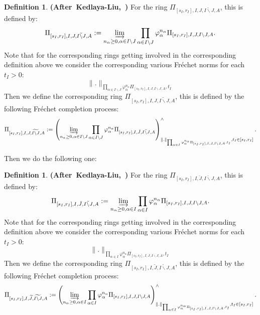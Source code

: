 \documentclass[12pt]{amsart}
\theoremstyle{definition}
\newtheorem{definition}[theorem]{Definition}
\numberwithin{equation}{section}
\begin{document}
\begin{definition}\mbox{\bf{(After Kedlaya-Liu, \cite[Definition 5.2.1]{KL2})}}
For the ring $\Pi_{[s_I,r_I],I,{J},\breve{I\backslash J},A}$, this is defined by:
\begin{align}
\Pi_{[s_I,r_I],I,{J},\breve{I\backslash J},A}:=\varinjlim_{n_\alpha\geq 0,\alpha  \in I\backslash J}\prod_{\alpha\in I\backslash J}\varphi_\alpha^{n_\alpha}\Pi_{[s_I,r_I],I,{J},I\backslash J,A}.
\end{align}
Note that for the corresponding rings getting involved in the corresponding definition above we consider the corresponding various Fr\'echet norms for each $t_I>0$:
\begin{displaymath}
\|.\|_{\prod_{\alpha\in I\backslash J}\varphi_\alpha^{n_\alpha}\Pi_{[s_I,r_I],I,{J},I\backslash J,A},t_I}	
\end{displaymath}
Then we define the corresponding ring $\Pi_{[s_I,r_I],I,{J},\widetilde{I\backslash J},A}$, this is defined by the following Fr\'echet completion process:
\begin{align}
\Pi_{[s_I,r_I],I,{J},\widetilde{I\backslash J},A}:=\left(\varinjlim_{n_\alpha\geq 0,\alpha  \in I\backslash J}\prod_{\alpha\in I\backslash J}\varphi_\alpha^{n_\alpha}\Pi_{[s_I,r_I],I,\breve{J},\breve{I\backslash J},A}\right)^\wedge_{\|.\|_{\prod_{\alpha\in I}\varphi_\alpha^{n_\alpha}\Pi_{[s_I,r_I],I,{J},I\backslash J,A},t_I},t_I\in [s_I,r_I]}.
\end{align}

  
\end{definition}



\indent Then we do the following one:

\begin{definition}\mbox{\bf{(After Kedlaya-Liu, \cite[Definition 5.2.1]{KL2})}}
For the ring $\Pi_{[s_I,r_I],I,\breve{J},\breve{I\backslash J},A}$, this is defined by:
\begin{align}
\Pi_{[s_I,r_I],I,\breve{J},\breve{I\backslash J},A}:=\varinjlim_{n_\alpha\geq 0,\alpha  \in I}\prod_{\alpha\in I}\varphi_\alpha^{n_\alpha}\Pi_{[s_I,r_I],I,{J},I\backslash J,A}.
\end{align}
Note that for the corresponding rings getting involved in the corresponding definition above we consider the corresponding various Fr\'echet norms for each $t_I>0$:
\begin{displaymath}
\|.\|_{\prod_{\alpha\in I}\varphi_\alpha^{n_\alpha}\Pi_{[s_I,r_I],I,{J},I\backslash J,A},t_I}	
\end{displaymath}
Then we define the corresponding ring $\Pi_{[s_I,r_I],I,\widetilde{J},\widetilde{I\backslash J},A}$, this is defined by the following Fr\'echet completion process:
\begin{align}
\Pi_{[s_I,r_I],I,\widetilde{J},\widetilde{I\backslash J},A}:=\left(\varinjlim_{n_\alpha\geq 0,\alpha  \in I}\prod_{\alpha\in I}\varphi_\alpha^{n_\alpha}\Pi_{[s_I,r_I],I,{J},I\backslash J,A}\right)^\wedge_{\|.\|_{\prod_{\alpha\in I}\varphi_\alpha^{n_\alpha}\Pi_{[s_I,r_I],I,{J},I\backslash J,A},t_I},t_I\in [s_I,r_I]}.
\end{align}

  
\end{definition}
\end{document}
